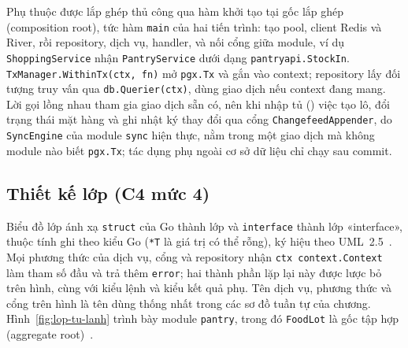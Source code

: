 Phụ thuộc được lắp ghép thủ công qua hàm khởi tạo tại gốc lắp ghép (composition root), tức hàm \texttt{main} của hai tiến trình: tạo pool, client Redis và River, rồi repository, dịch vụ, handler, và nối cổng giữa module, ví dụ \texttt{ShoppingService} nhận \texttt{PantryService} dưới dạng \texttt{pantryapi.StockIn}. \texttt{TxManager.WithinTx(ctx, fn)} mở \texttt{pgx.Tx} và gắn vào context; repository lấy đối tượng truy vấn qua \texttt{db.Querier(ctx)}, dùng giao dịch nếu context đang mang. Lời gọi lồng nhau tham gia giao dịch sẵn có, nên khi nhập tủ () việc tạo lô, đổi trạng thái mặt hàng và ghi nhật ký thay đổi qua cổng \texttt{ChangefeedAppender}, do \texttt{SyncEngine} của module \texttt{sync} hiện thực, nằm trong một giao dịch mà không module nào biết \texttt{pgx.Tx}; tác dụng phụ ngoài cơ sở dữ liệu chỉ chạy sau commit.

\subsection{Thiết kế lớp (C4 mức 4)}\label{ssec:thiet-ke-lop}

Biểu đồ lớp ánh xạ \texttt{struct} của Go thành lớp và \texttt{interface} thành lớp «interface», thuộc tính ghi theo kiểu Go (\texttt{*T} là giá trị có thể rỗng), ký hiệu theo UML~2.5~\cite{uml251}. Mọi phương thức của dịch vụ, cổng và repository nhận \texttt{ctx context.Context} làm tham số đầu và trả thêm \texttt{error}; hai thành phần lặp lại này được lược bỏ trên hình, cùng với kiểu lệnh và kiểu kết quả phụ. Tên dịch vụ, phương thức và cổng trên hình là tên dùng thống nhất trong các sơ đồ tuần tự của chương. Hình~\ref{fig:lop-tu-lanh} trình bày module \texttt{pantry}, trong đó \texttt{FoodLot} là gốc tập hợp (aggregate root)~\cite{evans}.


